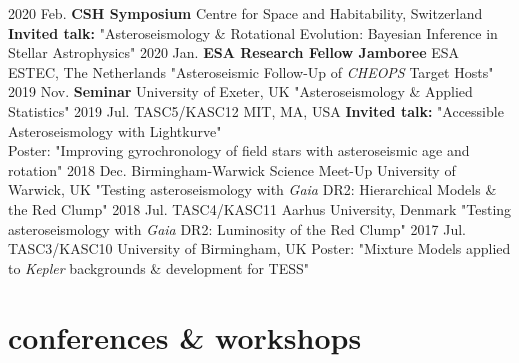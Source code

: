 \documentclass[letterpaper]{k-cv} %
\begin{document}
\begin{entrylist}
\entry
{2020 Feb.}
{\textbf{CSH Symposium}}
{Centre for Space and Habitability, Switzerland}
{\textbf{\textcolor{c1}{Invited talk:}} "Asteroseismology \& Rotational Evolution: Bayesian Inference in Stellar Astrophysics"}
\entry
{2020 Jan.}
{\textbf{ESA Research Fellow Jamboree}}
{ESA ESTEC, The Netherlands}
{"Asteroseismic Follow-Up of \textit{CHEOPS} Target Hosts"}
\entry
{2019 Nov.}
{\textbf{\textcolor{c1}{Seminar}}}
{University of Exeter, UK}
{"Asteroseismology \& Applied Statistics"}
\entry
{2019 Jul.}
{TASC5/KASC12}
{MIT, MA, USA}
{\textbf{\textcolor{c1}{Invited talk:}} "Accessible Asteroseismology with Lightkurve"\\ \small{Poster: "Improving gyrochronology of field stars with asteroseismic age and rotation"}}
\entry
{2018 Dec.}
{Birmingham-Warwick Science Meet-Up}
{University of Warwick, UK}
{"Testing asteroseismology with \textit{Gaia} DR2: Hierarchical Models \& the Red Clump"}
\entry
{2018 Jul.}
{TASC4/KASC11}
{Aarhus University, Denmark}
{"Testing asteroseismology with \textit{Gaia} DR2: Luminosity of the Red Clump"}
\entry
{2017 Jul.}
{TASC3/KASC10}
{University of Birmingham, UK}
{\small{Poster: "Mixture Models applied to \emph{Kepler} backgrounds \& development for TESS"}}
\end{entrylist}

\section{\color{c2}conferences \& workshops}
\end{document}
